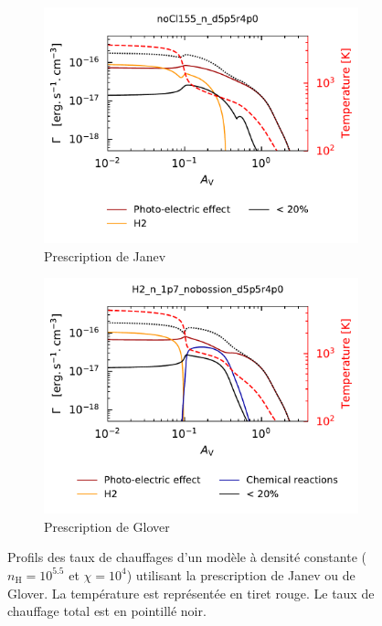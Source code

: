 \begin{figure}[!h]
    \centering
    \begin{subfigure}[t]{0.49\textwidth} %
        \centering \includegraphics[trim = {0 0 0 1cm },clip,width=1\textwidth]{figure/H2/bosse_dcte_janevVSglover/janev/heat.pdf}
        \caption{Prescription de Janev}
    \end{subfigure}
    \begin{subfigure}[t]{0.49\textwidth}
        \centering \includegraphics[trim = {0 0 0 1cm },clip,width=1\textwidth]{figure/H2/bosse_dcte_janevVSglover/glover/heat.pdf}
        \caption{Prescription de Glover}
    \end{subfigure}
    \caption{Profils des taux de chauffages d'un modèle à densité constante ($n_\mathrm{H} = 10^{5.5}$ et $\chi = 10^4$) utilisant la prescription de Janev ou de Glover. La température est représentée en tiret rouge. Le taux de chauffage total est en pointillé noir.}
    \label{fig:H2:bosse:heat}
\end{figure}


